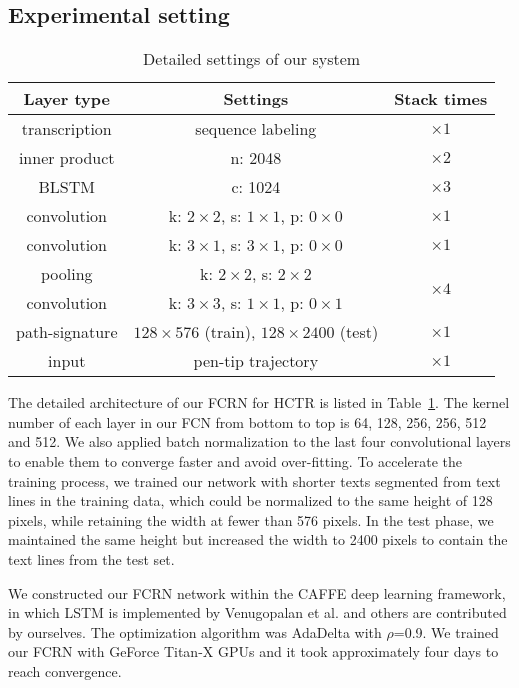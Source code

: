 \documentclass[10pt,conference,a4paper]{IEEEtran}
\begin{document}
\subsection{Experimental setting}
\begin{table}[t]
\caption{Detailed settings of our system}
\label{TableFCRNArchitecture}
\begin{tabular}{|c|c|c|}
\hline
Layer type            &Settings               &Stack times    \\
\hline
transcription   &sequence labeling          &$\times 1$     \\
\hline
inner product   &n: 2048                     &$\times 2$     \\
\hline
BLSTM           &c: 1024                     &$\times 3$     \\
\hline
convolution     &k: $2\times 2$, s: $1\times 1$, p: $0\times 0$     &$\times 1$  \\
\hline
convolution     &k: $3\times 1$, s: $3\times 1$, p: $0\times 0$     &$\times 1$  \\
\hline
pooling         &k: $2\times 2$, s: $2\times 2$                   &\multirow{2}{*}{$\times 4$}  \\
\cline{1-2}
convolution     &k: $3\times 3$, s: $1\times 1$, p: $0\times 1$      &          \\
\hline
path-signature  &$128\times 576$ (train), $128\times 2400$ (test)  &$\times 1$ \\
\hline
input           &pen-tip trajectory                             &$\times 1$  \\
\hline
\end{tabular}
\end{table}
The detailed architecture of our FCRN for HCTR is listed in Table~\ref{TableFCRNArchitecture}.
The kernel number of each layer in our FCN from bottom to top is 64, 128, 256, 256, 512 and 512.
We also applied batch normalization\cite{ioffe2015batch} to the last four convolutional layers to enable them to converge faster and avoid over-fitting.
To accelerate the training process, we trained our network with shorter texts segmented from text lines in the training data, which could be normalized to the same height of 128 pixels, while retaining the width at fewer than 576 pixels.
In the test phase, we maintained the same height but increased the width to 2400 pixels to contain the text lines from the test set.


We constructed our FCRN network within the CAFFE\cite{jia2014caffe} deep learning framework, in which LSTM is implemented by Venugopalan et al.\cite{venugopalan2015sequence} and others are contributed by ourselves.
The optimization algorithm was AdaDelta with $\rho$=0.9. We trained our FCRN with GeForce Titan-X GPUs and it took approximately four days to reach convergence.
\end{document}
